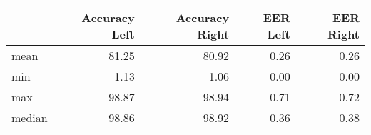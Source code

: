 \begin{tabular}{lrrrr}
\toprule
{} &  Accuracy Left &  Accuracy Right &  EER Left &  EER Right \\
\midrule
mean   &          81.25 &           80.92 &      0.26 &       0.26 \\
min    &           1.13 &            1.06 &      0.00 &       0.00 \\
max    &          98.87 &           98.94 &      0.71 &       0.72 \\
median &          98.86 &           98.92 &      0.36 &       0.38 \\
\bottomrule
\end{tabular}
